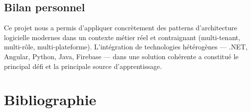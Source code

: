 \section*{Bilan personnel}

Ce projet nous a permis d'appliquer concrètement des patterns d'architecture
logicielle modernes dans un contexte métier réel et contraignant (multi-tenant,
multi-rôle, multi-plateforme). L'intégration de technologies hétérogènes ---
.NET, Angular, Python, Java, Firebase --- dans une solution cohérente a constitué
le principal défi et la principale source d'apprentissage.

\cleardoublepage

\chapter*{Bibliographie}
\thispagestyle{plain}

